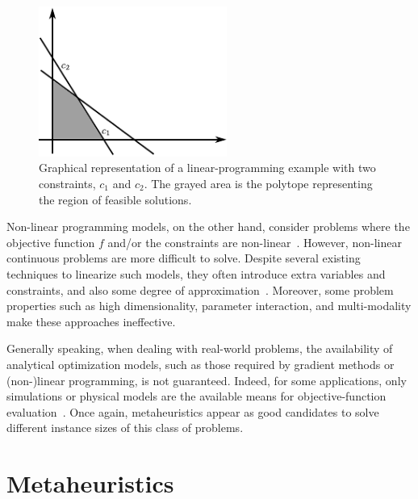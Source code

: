 \begin{figure}
\centering

\includegraphics[width=0.55\textwidth]{02-background_and_motivation/img/linear_programming}

\caption{Graphical representation of a linear-programming example with two
constraints, $c_{1}$ and $c_{2}$. The grayed area is the polytope
representing the region of feasible solutions. \label{fig:02-linear_programming_example}}
\end{figure}


Non-linear programming models, on the other hand, consider problems
where the objective function $f$ and/or the constraints are non-linear~\cite{Bazaraa-Nonlinear_programming:2006}.
However, non-linear continuous problems are more difficult to solve.
Despite several existing techniques to linearize such models, they
often introduce extra variables and constraints, and also some degree
of approximation~\cite{Glover-Improved_linear_programming_formulations_for_nonlinear_problems:1975}.
Moreover, some problem properties such as high dimensionality, parameter
interaction, and multi-modality make these approaches ineffective.

\bigskip{}


Generally speaking, when dealing with real-world problems, the availability
of analytical optimization models, such as those required by gradient
methods or (non-)linear programming, is not guaranteed. Indeed, for
some applications, only simulations or physical models are the available
means for objective-function evaluation~\cite{Fu-Optimization_for_simulation:2002}.
Once again, metaheuristics appear as good candidates to solve different
instance sizes of this class of problems. 


\section{Metaheuristics \label{sec:02-Metaheuristics}}

